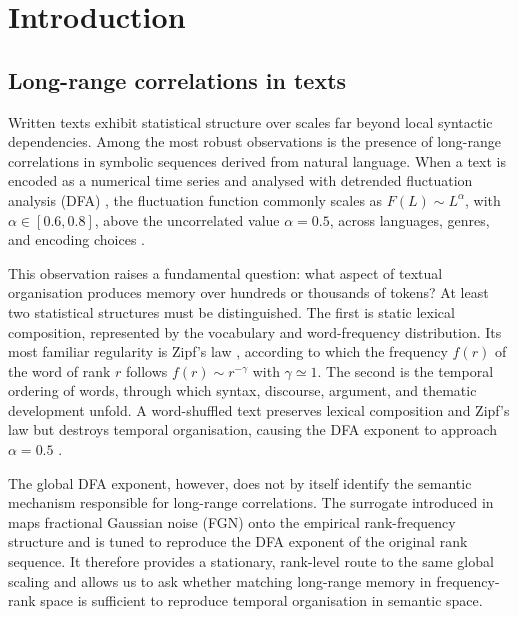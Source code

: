 \documentclass[preprint]{elsarticle}
\begin{document}
\section{Introduction}
\label{sec:intro}

\subsection{Long-range correlations in texts}

Written texts exhibit statistical structure over scales far beyond
local syntactic dependencies.
Among the most robust observations is the presence of long-range
correlations in symbolic sequences derived from natural language.
When a text is encoded as a numerical time series and analysed with
detrended fluctuation analysis (DFA) \citep{Peng1994}, the fluctuation
function commonly scales as $F(L)\sim L^\alpha$, with
$\alpha\in[0.6,0.8]$, above the uncorrelated value $\alpha=0.5$,
across languages, genres, and encoding choices
\citep{Ebeling1995,MontemurroPury2002}.

This observation raises a fundamental question: what aspect of textual
organisation produces memory over hundreds or thousands of tokens?
At least two statistical structures must be distinguished.
The first is static lexical composition, represented by the vocabulary
and word-frequency distribution.
Its most familiar regularity is Zipf's law \citep{Zipf1949}, according
to which the frequency $f(r)$ of the word of rank $r$ follows
$f(r)\sim r^{-\gamma}$ with $\gamma\simeq1$.
The second is the temporal ordering of words, through which syntax,
discourse, argument, and thematic development unfold.
A word-shuffled text preserves lexical composition and Zipf's law but
destroys temporal organisation, causing the DFA exponent to approach
$\alpha=0.5$ \citep{Ebeling1995,MontemurroPury2002}.

The global DFA exponent, however, does not by itself identify the
semantic mechanism responsible for long-range correlations.
The surrogate introduced in \citet{DegliEsposti2025} maps fractional
Gaussian noise (FGN) onto the empirical rank-frequency structure and is
tuned to reproduce the DFA exponent of the original rank sequence.
It therefore provides a stationary, rank-level route to the same global
scaling and allows us to ask whether matching long-range memory in
frequency-rank space is sufficient to reproduce temporal organisation in
semantic space.
\end{document}
